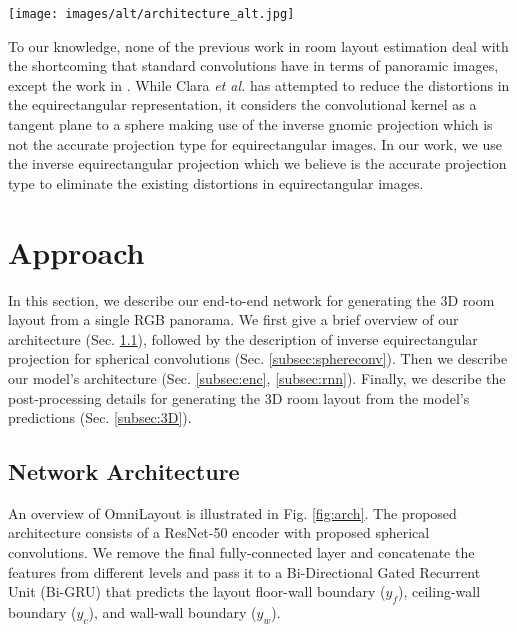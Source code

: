 \documentclass[final]{cvpr}
\begin{document}
\begin{figure*}[!t]
    \centering
    \texttt{[image: images/alt/architecture\_alt.jpg]}
    \caption{\textbf{OmniLayout architecture:} Our model is built on ResNet followed by Bi-Directional GRU that predicts the positions of corners of the room. We have replaced the standard convolution from each block of ResNet with the sphere convolution (inverse equirectangular projection). The output of the network is a 1D representation map of shape $3 \times 1 \times 1024 $. Since the width of the panorama is 1024 the output map has 3 values per column: $y_c$ (ceiling-wall), $y_f$ (floor-wall) and $y_w$ (wall-wall / corners).}
    \label{fig:arch}
\end{figure*}


To our knowledge, none of the previous work in room layout estimation deal with the shortcoming that standard convolutions have in terms of panoramic images, except the work in \cite{fernandez2020corners}. While Clara \textit{et al.} \cite{fernandez2020corners} has attempted to reduce the distortions in the equirectangular representation, it considers the convolutional kernel as a tangent plane to a sphere making use of the inverse gnomic projection which is not the accurate projection type for equirectangular images. In our work, we use the inverse equirectangular projection which we believe is the accurate projection type to eliminate the existing distortions in equirectangular images.   



\section{Approach}\label{sec:app}



In this section, we describe our end-to-end network for generating the 3D room layout from a single RGB panorama. We first give a brief overview of our architecture (Sec. \ref{subsec:brief}), followed by the description of inverse equirectangular projection for spherical convolutions (Sec. \ref{subsec:sphereconv}). Then we describe our model's architecture (Sec. \ref{subsec:enc}, \ref{subsec:rnn}). Finally, we describe the post-processing details for generating the 3D room layout from the model's predictions (Sec. \ref{subsec:3D}).

\subsection{Network Architecture}\label{subsec:brief}
An overview of OmniLayout is illustrated in Fig. \ref{fig:arch}. The proposed architecture consists of a ResNet-50 \cite{he2016deep} encoder with proposed spherical convolutions. We remove the final fully-connected layer and concatenate the features from different levels and pass it to a Bi-Directional Gated Recurrent Unit (Bi-GRU) \cite{chung2014empirical} that predicts the layout floor-wall boundary ($y_f$), ceiling-wall boundary ($y_c$), and wall-wall boundary ($y_w$).
\end{document}
